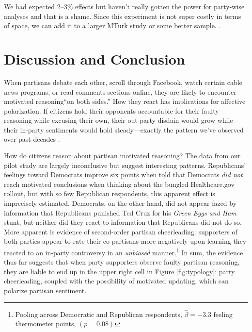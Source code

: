 \documentclass[12pt, letterpaper]{article}
\begin{document}


We had expected 2--3\% effects but haven't really gotten the power for party-wise analyses and that is a shame. Since this experiment is not super costly in terms of space, we can add it to a larger MTurk study or some better sample. .

\section*{Discussion and Conclusion}

When partisans debate each other, scroll through Facebook, watch certain cable news programs, or read comments sections online, they are likely to encounter motivated reasoning``on both sides.'' How they react has implications for affective polarization. If citizens hold their opponents accountable for their faulty reasoning while excusing their own, their out-party disdain would grow while their in-party sentiments would hold steady---exactly the pattern we've observed over past decades \citep{IyengarSoodLelkes2012}. 

How do citizens reason about partisan motivated reasoning? The data from our pilot study are largely inconclusive but suggest interesting patterns. Republicans' feelings toward Democrats improve six points when told that Democrats \emph{did not} reach motivated conclusions when thinking about the bungled Healthcare.gov rollout, but with so few Republican respondents, this apparent effect is imprecisely estimated. Democrats, on the other hand, did not appear fazed by information that Republicans punished Ted Cruz for his \emph{Green Eggs and Ham} stunt, but neither did they react to information that Republicans did not do so. More apparent is evidence of second-order partisan cheerleading: supporters of both parties appear to rate their co-partisans more negatively upon learning they reacted to an in-party controversy in an \emph{unbiased} manner.\footnote{Pooling across Democratic and Republican respondents, $\hat{\beta}=-3.3$ feeling thermometer points, $(p = 0.08)$} In sum, the evidence thus far suggests that when party supporters observe faulty partisan reasoning, they are liable to end up in the upper right cell in Figure \ref{fig:typology}: party cheerleading, coupled with the possibility of motivated updating, which can polarize partisan sentiment.
\end{document}
